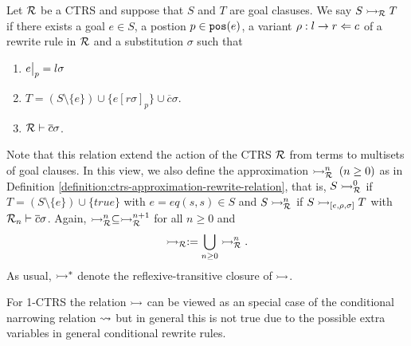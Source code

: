 \begin{definition}\label{definition:rewrite-on-goals}
	Let $\mathcal{R}$ be a CTRS and suppose that $S$ and $T$ are goal clasuses. We say $S \rightarrowtail_{\mathcal{R}} T$ if there exists a goal $e \in S$, a postion $p \in \mathtt{pos}(e)$, a variant $\rho : l \rightarrow r \Leftarrow c$ of a rewrite rule in $\mathcal{R}$ and a substitution $\sigma$ such that
	\begin{enumerate}
		\item $\restr{e}{p} = l \sigma$
		\item $T = (S \setminus \{e\}) \cup \{ e[r\sigma]_p \} \cup \overline{c} \sigma$.
		\item $\mathcal{R} \vdash \overline{c} \sigma$.
	\end{enumerate}
\end{definition}

Note that this relation extend the action of the CTRS $\mathcal{R}$ from terms to multisets of goal clauses. In this view, we also define the approximation $\rightarrowtail_{\mathcal{R}}^n \; (n \geq 0)$ as in Definition \ref{definition:ctrs-approximation-rewrite-relation}, that is, $S \rightarrowtail_{\mathcal{R}}^0$ if $T = (S \setminus \{e\}) \cup \{true\}$ with $e = eq(s,s) \in S$ and $S \rightarrowtail_{\mathcal{R}}^n$ if $S \rightarrowtail_{[e, \rho, \sigma]} T$ with $\mathcal{R}_n \vdash \overline{c} \sigma$. Again, $\rightarrowtail_{\mathcal{R}}^n \subseteq \rightarrowtail_{\mathcal{R}}^{n+1}$ for all $n \geq 0$ and
$$\rightarrowtail_{\mathcal{R}} := \bigcup\limits_{n \geq 0} \rightarrowtail_{\mathcal{R}}^n.$$
As usual, $\rightarrowtail^*$ denote the reflexive-transitive closure of $\rightarrowtail$.
\begin{remark}
	For 1-CTRS the relation $\rightarrowtail$ can be viewed as an special case of the conditional narrowing relation $\mathbin{\rightsquigarrow}$ but in general this is not true due to the possible extra variables in general conditional rewrite rules.
\end{remark}

